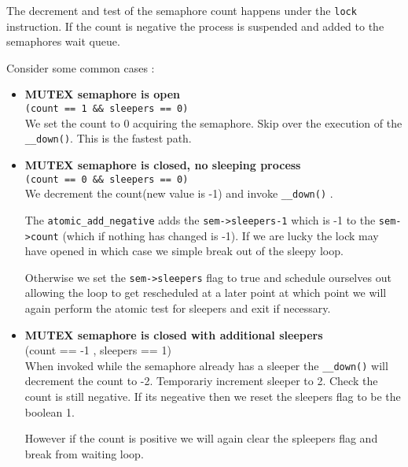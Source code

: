 \documentclass{article}
\begin{document}
The decrement and test of the semaphore count happens under the
\lstinline{lock} instruction. If the count is negative the process is
suspended and added to the semaphores wait queue. 


Consider some common cases :


\begin{itemize}
\item \textbf{MUTEX semaphore is open} \\
  \lstinline{(count == 1 && sleepers == 0)} \\  
  We set the count to 0 acquiring the semaphore. Skip over the
  execution of the \lstinline{__down()}. This is the fastest path.

\item \textbf{MUTEX semaphore is closed, no sleeping process} \\
  \lstinline{(count == 0 && sleepers == 0)} \\
  
  We decrement the count(new value is -1) and invoke
  \lstinline{__down()} .

  The \lstinline{atomic_add_negative} adds the
  \lstinline{sem->sleepers-1} which is -1 to the
  \lstinline{sem->count} (which if nothing has changed is -1). If we
  are lucky the lock may have opened in which case we simple break out
  of the sleepy loop.

  Otherwise we set the \lstinline{sem->sleepers} flag to true and
  schedule ourselves out allowing the loop to get rescheduled at a
  later point at which point we will again perform the atomic test for
  sleepers and exit if necessary.


\item \textbf{MUTEX semaphore is closed with additional sleepers} \\
  (count  == -1 , sleepers == 1) \\

  When invoked while the semaphore already has a sleeper the
  \lstinline{__down()} will decrement the count to -2. Temporariy
  increment sleeper to 2. Check the count is still negative. If its
  negeative then we reset the sleepers flag to be the boolean 1.

  However if the count is positive we will again clear the spleepers
  flag and break from waiting loop.  
\end{itemize}
\end{document}
